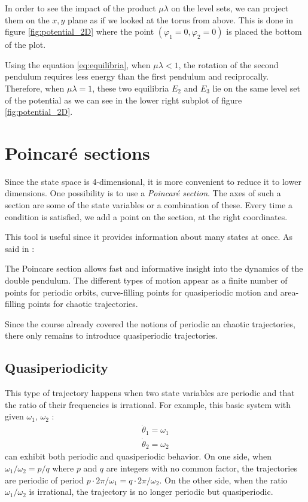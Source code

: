 \documentclass[11 pt]{article}
\begin{document}
In order to see the impact of the product $\mu \lambda$ on the level sets, we can project them on the $x,y$ plane as if we looked at the torus from above. This is done in figure \ref{fig:potential_2D} where the point $(\varphi_1=0, \varphi_2=0)$ is placed the bottom of the plot.

Using the equation \eqref{eq:equilibria}, when $\mu \lambda < 1$, the rotation of the second pendulum requires less energy than the first pendulum and reciprocally. Therefore, when $\mu \lambda = 1$, these two equilibria $E_2$ and $E_3$ lie on the same level set of the potential as we can see in the lower right subplot of figure \ref{fig:potential_2D}.


\section{Poincaré sections}
Since the state space is 4-dimensional, it is more convenient to reduce it to lower dimensions. One possibility is to use a \textit{Poincaré section}. The axes of such a section are some of the state variables or a combination of these. Every time a condition is satisfied, we add a point on the section, at the right coordinates.

This tool is useful since it provides information about many states at once. As said in \cite{ChaosPC}:
\begin{displayquote}
    The Poincare section allows fast and informative insight into the dynamics of the double pendulum. The different types of motion appear as a finite number of points for periodic orbits, curve-filling points for quasiperiodic motion and area-filling points for chaotic trajectories.
\end{displayquote}

Since the course already covered the notions of periodic an chaotic trajectories, there only remains to introduce quasiperiodic trajectories. 

\subsection{Quasiperiodicity}
This type of trajectory happens when two state variables are periodic and that the ratio of their frequencies is irrational. For example, this basic system with given $\omega_1$, $\omega_2$ \cite[p. 276]{strogatz2018nonlinear}:
\begin{align*}
    \dot \theta_1 = \omega_1\\
    \dot \theta_2 = \omega_2
\end{align*}
can exhibit both periodic and quasiperiodic behavior. On one side, when $\omega_1/\omega_2 = p/q$ where $p$ and $q$ are integers with no common factor, the trajectories are periodic of period $p \cdot 2\pi/ \omega_1 = q \cdot 2 \pi / \omega_2$. On the other side, when the ratio $\omega_1/\omega_2$ is irrational, the trajectory is no longer periodic but quasiperiodic.
\end{document}
